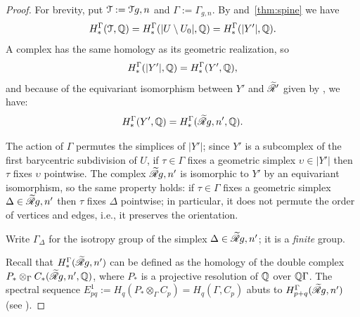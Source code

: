 \begin{proof}
  For brevity, put $\mathcal{T} := \mathcal{T}{g,n}$ and $\Gamma := \Gamma_{g,n}$.  By 
  and~\ref{thm:spine} we have
  \begin{equation*}
    H^\Gamma_*(\mathcal{T}, \mathbb{Q}) = H^\Gamma_*(|U \setminus U_0|, \mathbb{Q}) = H^\Gamma_*(|Y'|, \mathbb{Q}).
  \end{equation*}
  A complex has the same homology as its geometric realization, so
  \begin{equation*}
    H^\Gamma_*(|Y'|, \mathbb{Q}) = H^\Gamma_*(Y', \mathbb{Q}),
  \end{equation*}
  and because of the equivariant isomorphism between $Y'$ and $\mathscr{\widetilde R}_{}'$
  given by , we have:
  \begin{equation*}
    H^\Gamma_*(Y', \mathbb{Q}) = H^\Gamma_*(\mathscr{\widetilde R}_{}{g,n}', \mathbb{Q}).
  \end{equation*}

  The action of $\Gamma$ permutes the simplices of $|Y'|$; since $Y'$ is a
  subcomplex of the first barycentric subdivision of $U$, if $\tau \in \Gamma$
  fixes a geometric simplex $\upsilon \in |Y'|$ then $\tau$ fixes $\upsilon$ pointwise.
  The complex $\mathscr{\widetilde R}_{}{g,n}'$ is isomorphic to $Y'$ by an equivariant
  isomorphism, so the same property holds: if $\tau \in \Gamma$ fixes a
  geometric simplex $\Delta \in \mathscr{\widetilde R}_{}{g,n}'$ then $\tau$ fixes $\Delta$ pointwise; in
  particular, it does not permute the order of vertices and edges,
  i.e., it preserves the orientation.

  Write $\Gamma_\Delta$ for the isotropy group of the simplex $\Delta \in \mathscr{\widetilde R}_{}{g,n}'$;
  it is a \emph{finite} group.

  Recall that $H^\Gamma_*(\mathscr{\widetilde R}_{}{g,n}')$ can be defined as the homology of
  the double complex $P_* \otimes_\Gamma C_*(\mathscr{\widetilde R}_{}{g,n}', \mathbb{Q})$, where $P_*$ is a
  projective resolution of $\mathbb{Q}$ over $\mathbb{Q}\Gamma$.  The spectral sequence
  $E^1_{pq} := H_q(P_* \otimes_\Gamma C_p) = H_q(\Gamma, C_p)$ abuts to
  $H^\Gamma_{p+q}(\mathscr{\widetilde R}_{}{g,n}')$ (see \cite[VII.5 and VII.7]{brown}).


\end{proof}
